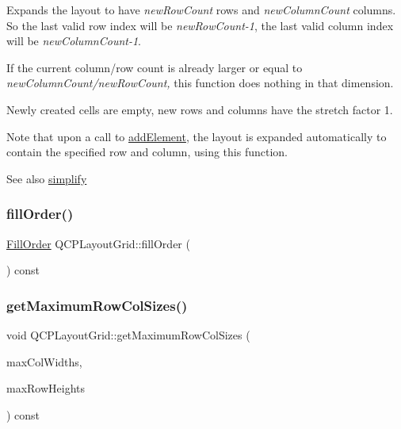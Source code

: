 Expands the layout to have {\itshape new\+Row\+Count} rows and {\itshape new\+Column\+Count} columns. So the last valid row index will be {\itshape new\+Row\+Count-\/1}, the last valid column index will be {\itshape new\+Column\+Count-\/1}.

If the current column/row count is already larger or equal to {\itshape new\+Column\+Count/{\itshape new\+Row\+Count},} this function does nothing in that dimension.

Newly created cells are empty, new rows and columns have the stretch factor 1.

Note that upon a call to \mbox{\hyperlink{class_q_c_p_layout_grid_adff1a2ca691ed83d2d24a4cd1fe17012}{add\+Element}}, the layout is expanded automatically to contain the specified row and column, using this function.

\begin{DoxySeeAlso}{See also}
\mbox{\hyperlink{class_q_c_p_layout_grid_a38621ca7aa633b6a9a88617df7f08672}{simplify}} 
\end{DoxySeeAlso}
\mbox{\label{class_q_c_p_layout_grid_a6cb6563a13759222ad92ae397bd6c27e}} 
\subsubsection{\texorpdfstring{fillOrder()}{fillOrder()}}
{\footnotesize\ttfamily \mbox{\hyperlink{class_q_c_p_layout_grid_a7d49ee08773de6b2fd246edfed353cca}{Fill\+Order}} Q\+C\+P\+Layout\+Grid\+::fill\+Order (\begin{DoxyParamCaption}{ }\end{DoxyParamCaption}) const\hspace{0.3cm}{\ttfamily [inline]}}

\mbox{\label{class_q_c_p_layout_grid_a9be77011ec5b5dfbe7fbda126659e1eb}} 
\subsubsection{\texorpdfstring{getMaximumRowColSizes()}{getMaximumRowColSizes()}}
{\footnotesize\ttfamily void Q\+C\+P\+Layout\+Grid\+::get\+Maximum\+Row\+Col\+Sizes (\begin{DoxyParamCaption}\item[{Q\+Vector$<$ int $>$ $\ast$}]{max\+Col\+Widths,  }\item[{Q\+Vector$<$ int $>$ $\ast$}]{max\+Row\+Heights }\end{DoxyParamCaption}) const\hspace{0.3cm}{\ttfamily [protected]}}

